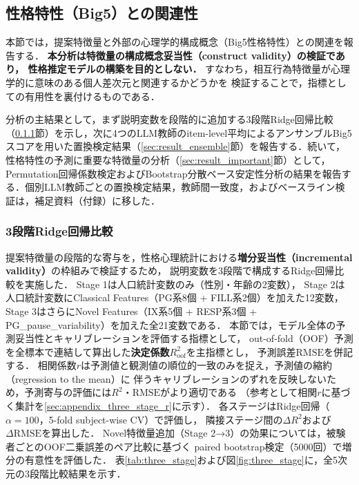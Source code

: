\documentclass[dvipdfmx,11pt,a4paper]{bxjsarticle}
\begin{document}
\subsection{性格特性（Big5）との関連性}
\label{sec:result_big5}

本節では，提案特徴量と外部の心理学的構成概念（Big5性格特性）との関連を報告する．
\textbf{本分析は特徴量の構成概念妥当性（construct validity）の検証であり，
性格推定モデルの構築を目的としない．}
すなわち，相互行為特徴量が心理学的に意味のある個人差次元と関連するかどうかを
検証することで，指標としての有用性を裏付けるものである．

分析の主結果として，まず説明変数を段階的に追加する3段階Ridge回帰比較（\ref{sec:result_three_stage}節）を示し，次に4つのLLM教師のitem-level平均によるアンサンブルBig5スコアを用いた置換検定結果（\ref{sec:result_ensemble}節）を報告する．続いて，性格特性の予測に重要な特徴量の分析（\ref{sec:result_important}節）として，Permutation回帰係数検定およびBootstrap分散ベース安定性分析の結果を報告する．個別LLM教師ごとの置換検定結果，教師間一致度，およびベースライン検証は，補足資料（付録）に移した．

\subsubsection{3段階Ridge回帰比較}
\label{sec:result_three_stage}

提案特徴量の段階的な寄与を，性格心理統計における\textbf{増分妥当性（incremental validity）}の枠組みで検証するため，
説明変数を3段階で構成するRidge回帰比較を実施した．
Stage 1は人口統計変数のみ（性別・年齢の2変数），
Stage 2は人口統計変数にClassical Features（PG系8個 + FILL系2個）を加えた12変数，
Stage 3はさらにNovel Features（IX系5個 + RESP系3個 + PG\_pause\_variability）を加えた全21変数である．
本節では，モデル全体の予測妥当性とキャリブレーションを評価する指標として，
out-of-fold（OOF）予測を全標本で連結して算出した\textbf{決定係数$R^2_{\text{oof}}$}を主指標とし，
予測誤差$\text{RMSE}$を併記する．
相関係数$r$は予測値と観測値の順位的一致のみを捉え，予測値の縮約（regression to the mean）に
伴うキャリブレーションのずれを反映しないため，予測寄与の評価には$R^2$・$\text{RMSE}$がより適切である
（参考として相関$r$に基づく集計を\ref{sec:appendix_three_stage_r}に示す）．
各ステージはRidge回帰（$\alpha = 100$，5-fold subject-wise CV）で評価し，
隣接ステージ間の$\Delta R^2$および$\Delta\text{RMSE}$を算出した．
Novel特徴量追加（Stage 2→3）の効果については，被験者ごとのOOF二乗誤差のペア比較に基づく
paired bootstrap検定（5000回）で増分の有意性を評価した．
表\ref{tab:three_stage}および図\ref{fig:three_stage}に，全5次元の3段階比較結果を示す．
\end{document}
